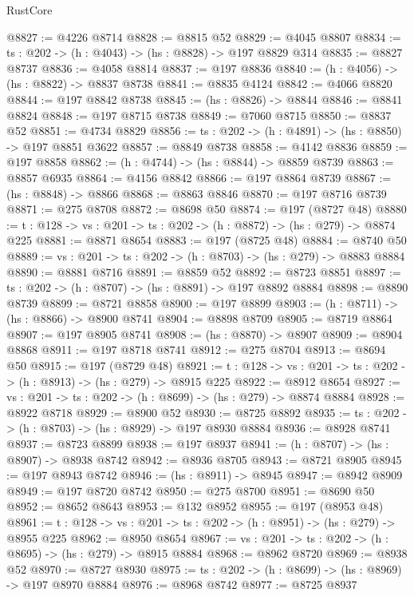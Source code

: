\begin{lexlean}{RustCore}
\begin{coremodule}
@8827 := @4226 @8714
@8828 := @8815 @52
@8829 := @4045 @8807
@8834 := {ts : @202} -> (h : @4043) -> (hs : @8828) -> @197 @8829 @314
@8835 := @8827 @8737
@8836 := @4058 @8814
@8837 := @197 @8836
@8840 := (h : @4056) -> (hs : @8822) -> @8837 @8738
@8841 := @8835 @4124
@8842 := @4066 @8820
@8844 := @197 @8842 @8738
@8845 := (hs : @8826) -> @8844
@8846 := @8841 @8824
@8848 := @197 @8715 @8738
@8849 := @7060 @8715
@8850 := @8837 @52
@8851 := @4734 @8829
@8856 := {ts : @202} -> (h : @4891) -> (hs : @8850) -> @197 @8851 @3622
@8857 := @8849 @8738
@8858 := @4142 @8836
@8859 := @197 @8858
@8862 := (h : @4744) -> (hs : @8844) -> @8859 @8739
@8863 := @8857 @6935
@8864 := @4156 @8842
@8866 := @197 @8864 @8739
@8867 := (hs : @8848) -> @8866
@8868 := @8863 @8846
@8870 := @197 @8716 @8739
@8871 := @275 @8708
@8872 := @8698 @50
@8874 := @197 (@8727 @48)
@8880 := {t : @128} -> {vs : @201} -> {ts : @202} -> (h : @8872) -> (hs : @279) -> @8874 @225
@8881 := @8871 @8654
@8883 := @197 (@8725 @48)
@8884 := @8740 @50
@8889 := {vs : @201} -> {ts : @202} -> (h : @8703) -> (hs : @279) -> @8883 @8884
@8890 := @8881 @8716
@8891 := @8859 @52
@8892 := @8723 @8851
@8897 := {ts : @202} -> (h : @8707) -> (hs : @8891) -> @197 @8892 @8884
@8898 := @8890 @8739
@8899 := @8721 @8858
@8900 := @197 @8899
@8903 := (h : @8711) -> (hs : @8866) -> @8900 @8741
@8904 := @8898 @8709
@8905 := @8719 @8864
@8907 := @197 @8905 @8741
@8908 := (hs : @8870) -> @8907
@8909 := @8904 @8868
@8911 := @197 @8718 @8741
@8912 := @275 @8704
@8913 := @8694 @50
@8915 := @197 (@8729 @48)
@8921 := {t : @128} -> {vs : @201} -> {ts : @202} -> (h : @8913) -> (hs : @279) -> @8915 @225
@8922 := @8912 @8654
@8927 := {vs : @201} -> {ts : @202} -> (h : @8699) -> (hs : @279) -> @8874 @8884
@8928 := @8922 @8718
@8929 := @8900 @52
@8930 := @8725 @8892
@8935 := {ts : @202} -> (h : @8703) -> (hs : @8929) -> @197 @8930 @8884
@8936 := @8928 @8741
@8937 := @8723 @8899
@8938 := @197 @8937
@8941 := (h : @8707) -> (hs : @8907) -> @8938 @8742
@8942 := @8936 @8705
@8943 := @8721 @8905
@8945 := @197 @8943 @8742
@8946 := (hs : @8911) -> @8945
@8947 := @8942 @8909
@8949 := @197 @8720 @8742
@8950 := @275 @8700
@8951 := @8690 @50
@8952 := @8652 @8643
@8953 := @132 @8952
@8955 := @197 (@8953 @48)
@8961 := {t : @128} -> {vs : @201} -> {ts : @202} -> (h : @8951) -> (hs : @279) -> @8955 @225
@8962 := @8950 @8654
@8967 := {vs : @201} -> {ts : @202} -> (h : @8695) -> (hs : @279) -> @8915 @8884
@8968 := @8962 @8720
@8969 := @8938 @52
@8970 := @8727 @8930
@8975 := {ts : @202} -> (h : @8699) -> (hs : @8969) -> @197 @8970 @8884
@8976 := @8968 @8742
@8977 := @8725 @8937

\end{coremodule}
\end{lexlean}
